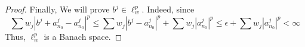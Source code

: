 \begin{answer}
\begin{proof}
        Finally, We will prove $b^j \in \ell_w^p$. Indeed, since
        \begin{equation}
            \sum w_j\left|b^j + a_{n_0}^j - a_{n_0}^j\right|^p \leq \sum w_j\left|b^j - a_{n_0}^j\right|^p + \sum w_j\left|a_{n_0}^j\right|^p \leq \epsilon + \sum w_j\left|a_{n_0}^j\right|^p <\infty
        \end{equation}
        Thus, $\ell_w^p$ is a Banach space.
    \end{proof}
\end{answer}